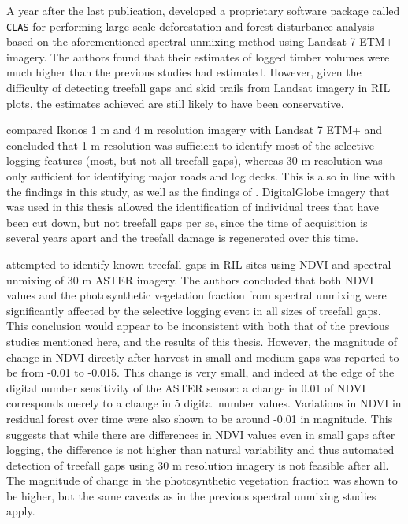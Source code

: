 \documentclass[a4paper,12pt]{scrbook}
\begin{document}
A year after the last publication, \citet{asner_selective_2005} developed a proprietary software package called \texttt{CLAS} for performing large-scale deforestation and forest disturbance analysis based on the aforementioned spectral unmixing method using Landsat 7 \ac{ETM+} imagery. The authors found that their estimates of logged timber volumes were much higher than the previous studies had estimated. However, given the difficulty of detecting treefall gaps and skid trails from Landsat imagery in \ac{RIL} plots, the estimates achieved are still likely to have been conservative.

\citet{read_spatial_2003} compared Ikonos 1 m and 4 m resolution imagery with Landsat 7 \ac{ETM+} and concluded that 1 m resolution was sufficient to identify most of the selective logging features (most, but not all treefall gaps), whereas 30 m resolution was only sufficient for identifying major roads and log decks. This is also in line with the findings in this study, as well as the findings of \citet{asner_remote_2002}. DigitalGlobe imagery that was used in this thesis allowed the identification of individual trees that have been cut down, but not treefall gaps per se, since the time of acquisition is several years apart and the treefall damage is regenerated over this time.

\citet{broadbent_recovery_2006} attempted to identify known treefall gaps in \ac{RIL} sites using \ac{NDVI} and spectral unmixing of 30 m \ac{ASTER} imagery. The authors concluded that both \ac{NDVI} values and the photosynthetic vegetation fraction from spectral unmixing were significantly affected by the selective logging event in all sizes of treefall gaps. This conclusion would appear to be inconsistent with both that of the previous studies mentioned here, and the results of this thesis. However, the magnitude of change in \ac{NDVI} directly after harvest in small and medium gaps was reported to be from -0.01 to -0.015. This change is very small, and indeed at the edge of the digital number sensitivity of the \ac{ASTER} sensor: a change in 0.01 of \ac{NDVI} corresponds merely to a change in 5 digital number values. Variations in \ac{NDVI} in residual forest over time were also shown to be around -0.01 in magnitude. This suggests that while there are differences in \ac{NDVI} values even in small gaps after logging, the difference is not higher than natural variability and thus automated detection of treefall gaps using 30 m resolution imagery is not feasible after all. The magnitude of change in the photosynthetic vegetation fraction was shown to be higher, but the same caveats as in the previous spectral unmixing studies apply.
\end{document}

